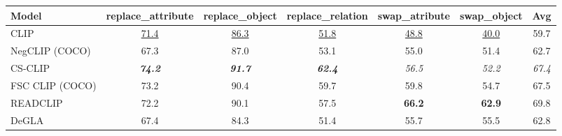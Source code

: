 \begin{tabular}{lcccccc}
\toprule
Model & replace\_attribute & replace\_object & replace\_relation & swap\_atribute & swap\_object & Avg \\
\midrule
CLIP & \underline{71.4} & \underline{86.3} & \underline{51.8} & \underline{48.8} & \underline{40.0} & 59.7 \\
NegCLIP (COCO) & 67.3 & 87.0 & 53.1 & 55.0 & 51.4 & 62.7 \\
CS-CLIP & \emph{\textbf{74.2}} & \emph{\textbf{91.7}} & \emph{\textbf{62.4}} & \emph{56.5} & \emph{52.2} & \emph{67.4} \\
FSC CLIP (COCO) & 73.2 & 90.4 & 59.7 & 59.8 & 54.7 & 67.5 \\
READCLIP & 72.2 & 90.1 & 57.5 & \textbf{66.2} & \textbf{62.9} & 69.8 \\
DeGLA & 67.4 & 84.3 & 51.4 & 55.7 & 55.5 & 62.8 \\
\bottomrule
\end{tabular}